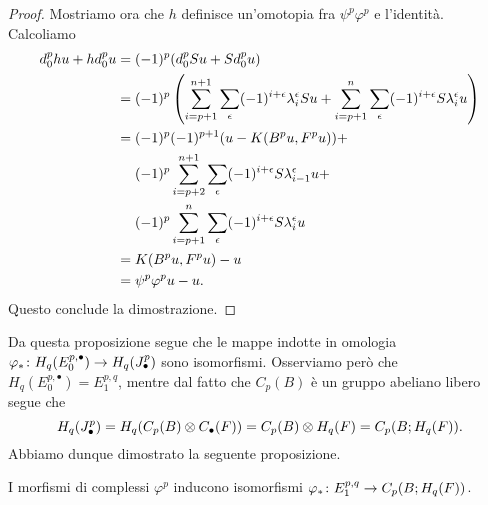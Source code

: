 \begin{proof}
Mostriamo ora che \(h\) definisce un'omotopia fra \(\psi^p\varphi^p\) e l'identità. Calcoliamo
\begin{align*}
d^p_0hu+hd^p_0u&=(-1)^p(d^p_0Su+Sd^p_0u)\\
&=(-1)^p\left(\sum_{i=p+1}^{n+1}\sum_\epsilon(-1)^{i+\epsilon}\lambda^\epsilon_iSu+\sum_{i=p+1}^n\sum_\epsilon(-1)^{i+\epsilon}S\lambda^\epsilon_iu\right)\\
&=(-1)^p(-1)^{p+1}(u-K(B^pu,F^pu))+\\
&\phantomop(-1)^p\sum_{i=p+2}^{n+1}\sum_\epsilon(-1)^{i+\epsilon}S\lambda^\epsilon_{i-1}u+\\
&\phantomop(-1)^p\sum_{i=p+1}^n\sum_\epsilon(-1)^{i+\epsilon}S\lambda^\epsilon_iu\\
&=K(B^pu,F^pu)-u\\
&=\psi^p\varphi^pu-u.
\end{align*}
Questo conclude la dimostrazione.
\end{proof}

Da questa proposizione segue che le mappe indotte in omologia \(\map{\varphi_*}{H_q(E^{p,\bullet}_0)}{H_q(J^p_\bullet)}\) sono isomorfismi. Osserviamo però che \(H_q(E^{p,\bullet}_0)=E^{p,q}_1\), mentre dal fatto che \(C_p(B)\) è un gruppo abeliano libero segue che
\[
H_q(J^p_\bullet)=H_q(C_p(B)\mathbin{\otimes} C_\bullet(F))=C_p(B)\mathbin{\otimes} H_q(F)=C_p(B;H_q(F)).
\]
Abbiamo dunque dimostrato la seguente proposizione.
\begin{proposition}
I morfismi di complessi \(\varphi^p\) inducono isomorfismi \(\map{\varphi_*}{E^{p,q}_1}{C_p(B;H_q(F))}\).
\end{proposition}

